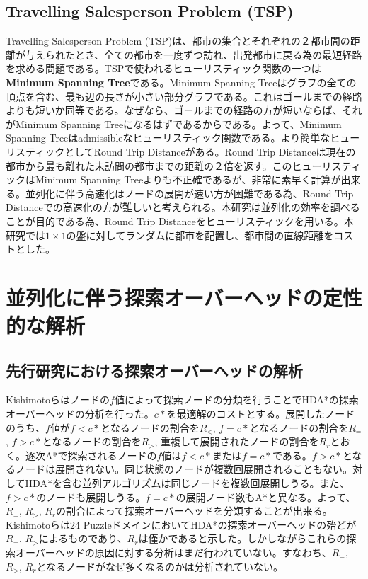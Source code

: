 \documentclass[uplatex]{jsarticle}
\begin{document}
\subsection{Travelling Salesperson Problem (TSP)}
Travelling Salesperson Problem (TSP)は、都市の集合とそれぞれの２都市間の距離が与えられたとき、全ての都市を一度ずつ訪れ、出発都市に戻る為の最短経路を求める問題である。TSPで使われるヒューリスティック関数の一つは\textbf{Minimum Spanning Tree}である。Minimum Spanning Treeはグラフの全ての頂点を含む、最も辺の長さが小さい部分グラフである。これはゴールまでの経路よりも短いか同等である。なぜなら、ゴールまでの経路の方が短いならば、それがMinimum Spanning Treeになるはずであるからである。よって、Minimum Spanning Treeはadmissibleなヒューリスティック関数である。より簡単なヒューリスティックとしてRound Trip Distanceがある。Round Trip Distanceは現在の都市から最も離れた未訪問の都市までの距離の２倍を返す。このヒューリスティックはMinimum Spanning Treeよりも不正確であるが、非常に素早く計算が出来る。並列化に伴う高速化はノードの展開が速い方が困難である為、Round Trip Distanceでの高速化の方が難しいと考えられる。本研究は並列化の効率を調べることが目的である為、Round Trip Distanceをヒューリスティックを用いる。本研究では$1\times1$の盤に対してランダムに都市を配置し、都市間の直線距離をコストとした。

\newpage

\section{並列化に伴う探索オーバーヘッドの定性的な解析}
\label{sec:analysis1}

\subsection{先行研究における探索オーバーヘッドの解析}
Kishimotoらはノードの$f$値によって探索ノードの分類を行うことでHDA*の探索オーバーヘッドの分析を行った\cite{Kishimoto2013}。$c*$を最適解のコストとする。展開したノードのうち、$f$値が$f < c*$となるノードの割合を$R_{<}$, $f = c*$となるノードの割合を$R_{=}$, $f > c*$となるノードの割合を$R_{>}$, 重複して展開されたノードの割合を$R_{r}$とおく。逐次A*で探索されるノードの$f$値は$f < c*$または$f = c*$である。$f > c*$となるノードは展開されない。同じ状態のノードが複数回展開されることもない。対してHDA*を含む並列アルゴリズムは同じノードを複数回展開しうる。また、$f > c*$のノードも展開しうる。$f = c*$の展開ノード数もA*と異なる。よって、$R_{=}$, $R_{>}$, $R_{r}$の割合によって探索オーバーヘッドを分類することが出来る。
Kishimotoらは24 PuzzleドメインにおいてHDA*の探索オーバーヘッドの殆どが$R_{=}$, $R_{>}$によるものであり、$R_{r}$は僅かであると示した。しかしながらこれらの探索オーバーヘッドの原因に対する分析はまだ行われていない。すなわち、$R_{=}$, $R_{>}$, $R_{r}$となるノードがなぜ多くなるのかは分析されていない。
\end{document}
